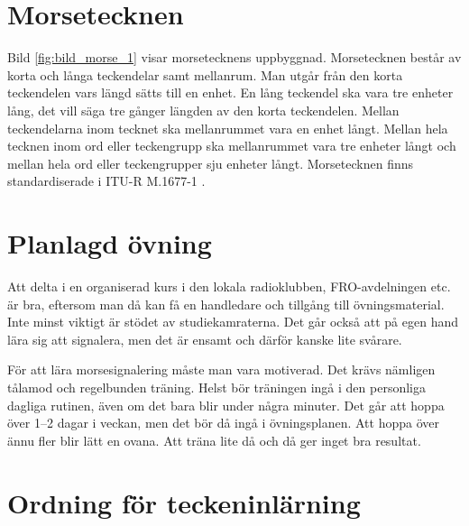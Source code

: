 \section{Morsetecknen}


Bild \ref{fig:bild_morse_1} visar morsetecknens uppbyggnad.
Morsetecknen består av korta och långa teckendelar samt mellanrum.
Man utgår från den korta teckendelen vars längd sätts till en enhet.
En lång teckendel ska vara tre enheter lång, det vill säga tre gånger längden
av den korta teckendelen.
Mellan teckendelarna inom tecknet ska mellanrummet vara en enhet långt.
Mellan hela tecknen inom ord eller teckengrupp ska mellanrummet vara
tre enheter långt och mellan hela ord eller teckengrupper sju enheter långt.
Morsetecknen finns standardiserade i ITU-R M.1677-1 \cite{M1677-1}.

\section{Planlagd övning}

Att delta i en organiserad kurs i den lokala radioklubben, FRO-avdelningen etc.
är bra, eftersom man då kan få en handledare och tillgång till övningsmaterial.
Inte minst viktigt är stödet av studiekamraterna.
Det går också att på egen hand lära sig att signalera, men det är ensamt och
därför kanske lite svårare.

För att lära morsesignalering måste man vara motiverad.
Det krävs nämligen tålamod och regelbunden träning.
Helst bör träningen ingå i den personliga dagliga rutinen, även om det bara
blir under några minuter.
Det går att hoppa över 1--2 dagar i veckan, men det bör då ingå i övningsplanen.
Att hoppa över ännu fler blir lätt en ovana.
Att träna lite då och då ger inget bra resultat.

\section[Inlärningsordning]{Ordning för teckeninlärning}

